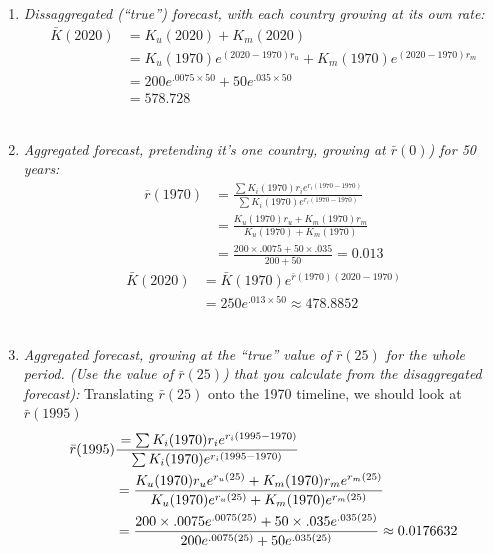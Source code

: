 \documentclass[]{book}
\providecommand{\tightlist}{%
  \setlength{\itemsep}{0pt}\setlength{\parskip}{0pt}}
\begin{document}
\begin{enumerate}
\begin{enumerate}
    \begin{enumerate}
    \def\labelenumiii{\roman{enumiii}.}
    \tightlist
    \item
      \emph{Dissaggregated (``true'') forecast, with each country growing at its own rate:}\\
      \[\begin{aligned}
       \bar{K}(2020) &= K_u(2020) + K_m(2020)\\ 
       &=K_u(1970) e^{(2020-1970)r_u} + K_m(1970) e^{(2020-1970)r_m}\\
       &=200e^{.0075\times 50} + 50e^{.035\times 50}\\
       &= 578.728 
       \end{aligned}\]\\
    \item
      \emph{Aggregated forecast, pretending it's one country, growing at \(\bar{r}(0)\)) for 50 years:}\\
      \[\begin{aligned}
       \overline{r}(1970) &= \frac{\sum K_i(1970)r_i e^{r_i (1970-1970)}} {\sum K_i(1970)e^{r_i (1970-1970) }}\\
       &=\frac{K_u(1970)r_u + K_m(1970)r_m }{K_u(1970) + K_m(1970) }\\
       & =  \frac{ 200\times .0075 + 50\times.035} {200+50 } = 0.013
       \end{aligned}\]
      \[\begin{aligned}
       \bar{K}(2020) &= \bar{K}(1970)e^{\bar{r}(1970) (2020-1970)}\\
       &= 250  e^{.013\times 50} \approx 478.8852
       \end{aligned}\]\\
    \item
      \emph{Aggregated forecast, growing at the ``true'' value of \(\bar{r}(25)\) for the whole period. (Use the value of \(\bar{r}(25)\)) that you calculate from the disaggregated forecast):}
      Translating \(\bar{r}(25)\) onto the 1970 timeline, we should look at \(\bar{r}(1995)\)
      \[\begin{aligned}
       \bar{r}(1995) &= \sum K_i(1970)r_i e^{r_i (1995-1970)} \over \sum K_i(1970)e^{r_i (1995-1970) }\\
       & = \frac{K_u(1970)r_u e^{r_u (25)} + K_m(1970)r_m e^{r_m (25)} }{K_u(1970)e^{r_u (25)} + K_m(1970)e^{r_m (25)} }\\ 
       & =\frac{200\times.0075 e^{.0075\left(25\right)}+50\times.035 e^{.035\left(25\right)}}{200 e^{.0075\left(25\right)}+50 e^{.035\left(25\right)}} \approx 0.0176632\\

\end{aligned}\]
\end{enumerate}
\end{enumerate}
\end{enumerate}
\end{document}
